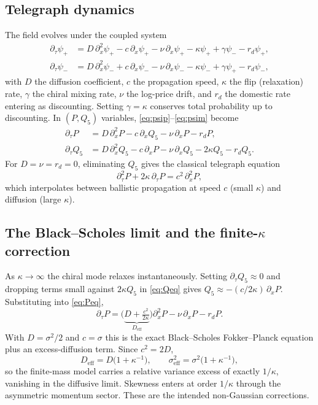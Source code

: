 \documentclass[11pt]{article}
\begin{document}
\subsection{Telegraph dynamics}

The field evolves under the coupled system
\begin{align}
\partial_\tau \psi_+ &= D\,\partial_x^2 \psi_+ - c\,\partial_x \psi_+
  - \nu\,\partial_x \psi_+ - \kappa \psi_+ + \gamma \psi_- - r_d \psi_+,
  \label{eq:psip}\\
\partial_\tau \psi_- &= D\,\partial_x^2 \psi_- + c\,\partial_x \psi_-
  - \nu\,\partial_x \psi_- - \kappa \psi_- + \gamma \psi_+ - r_d \psi_-,
  \label{eq:psim}
\end{align}
with $D$ the diffusion coefficient, $c$ the propagation speed, $\kappa$ the
flip (relaxation) rate, $\gamma$ the chiral mixing rate, $\nu$ the log-price
drift, and $r_d$ the domestic rate entering as discounting. Setting
$\gamma = \kappa$ conserves total probability up to discounting. In
$(P, Q_5)$ variables, \eqref{eq:psip}--\eqref{eq:psim} become
\begin{align}
\partial_\tau P &= D\,\partial_x^2 P - c\,\partial_x Q_5 - \nu\,\partial_x P - r_d P,
  \label{eq:Peq}\\
\partial_\tau Q_5 &= D\,\partial_x^2 Q_5 - c\,\partial_x P - \nu\,\partial_x Q_5
  - 2\kappa Q_5 - r_d Q_5.
  \label{eq:Qeq}
\end{align}
For $D = \nu = r_d = 0$, eliminating $Q_5$ gives the classical telegraph
equation
\begin{equation}
\partial_\tau^2 P + 2\kappa\,\partial_\tau P = c^2\,\partial_x^2 P,
\end{equation}
which interpolates between ballistic propagation at speed $c$ (small
$\kappa$) and diffusion (large $\kappa$).

\subsection{The Black--Scholes limit and the finite-$\kappa$ correction}

As $\kappa \to \infty$ the chiral mode relaxes instantaneously. Setting
$\partial_\tau Q_5 \approx 0$ and dropping terms small against $2\kappa Q_5$
in \eqref{eq:Qeq} gives $Q_5 \approx -(c/2\kappa)\,\partial_x P$.
Substituting into \eqref{eq:Peq},
\begin{equation}
\partial_\tau P = \Big(\underbrace{D + \tfrac{c^2}{2\kappa}}_{D_{\text{eff}}}\Big)\partial_x^2 P
  - \nu\,\partial_x P - r_d P.
\label{eq:bslimit}
\end{equation}
With $D = \sigma^2/2$ and $c = \sigma$ this is the exact Black--Scholes
Fokker--Planck equation plus an excess-diffusion term. Since $c^2 = 2D$,
\begin{equation}
D_{\text{eff}} = D\big(1 + \kappa^{-1}\big),
\qquad
\sigma_{\text{eff}}^2 = \sigma^2\big(1 + \kappa^{-1}\big),
\end{equation}
so the finite-mass model carries a relative variance excess of exactly
$1/\kappa$, vanishing in the diffusive limit. Skewness enters at order
$1/\kappa$ through the asymmetric momentum sector. These are the intended
non-Gaussian corrections.
\end{document}
